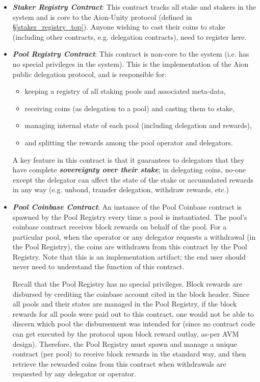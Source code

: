 \begin{itemize}
    \item \textbf{\textit{Staker Registry Contract}}: This contract tracks all stake and stakers in the system and is core to the Aion-Unity protocol (defined in \S\ref{staker_registry_top}). Anyone wishing to cast their coins to stake (including other contracts, e.g. delegation contracts), need to register here. 
    
    \item \textbf{\textit{Pool Registry Contract}}: This contract is non-core to the system (i.e. has no special privileges in the system). This is the implementation of the Aion public delegation protocol, and is responsible for: 
    \begin{itemize}[label=--,nosep]
        \item keeping a registry of all staking pools and associated meta-data,
        \item receiving coins (as delegation to a pool) and casting them to stake, 
        \item managing internal state of each pool (including delegation and rewards),
        \item and splitting the rewards among the pool operator and delegators. 
    \end{itemize}
    
    A key feature in this contract is that it guarantees to delegators that they have complete \textit{\textbf{sovereignty over their stake}}; in delegating coins, no-one except the delegator can affect the state of the stake or accumulated rewards in any way (e.g. unbond, transfer delegation, withdraw rewards, etc.) 
    
    \item \textbf{\textit{Pool Coinbase Contract}}: An instance of the Pool Coinbase contract is spawned by the Pool Registry every time a pool is instantiated. The pool's coinbase contract receives block rewards on behalf of the pool. For a particular pool, when the operator or any delegator requests a withdrawal (in the Pool Registry), the coins are withdrawn from this contract by the Pool Registry. Note that this is an implementation artifact; the end user should never need to understand the function of this contract. 
    
    Recall that the Pool Registry has no special privileges. Block rewards are disbursed by crediting the coinbase account cited in the block header. Since all pools and their states are managed in the Pool Registry, if the block rewards for all pools were paid out to this contract, one would not be able to discern which pool the disbursement was intended for (since no contract code can get executed by the protocol upon block reward outlay, as-per AVM design). Therefore, the Pool Registry must spawn and manage a unique contract (per pool) to receive block rewards in the standard way, and then retrieve the rewarded coins from this contract when withdrawals are requested by any delegator or operator.  
\end{itemize}


